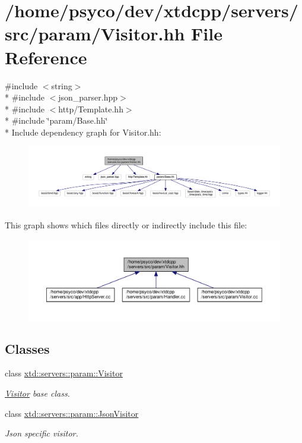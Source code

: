 \hypertarget{Visitor_8hh}{}\section{/home/psyco/dev/xtdcpp/servers/src/param/\+Visitor.hh File Reference}
\label{Visitor_8hh}
{\ttfamily \#include $<$string$>$}\\*
{\ttfamily \#include $<$json\+\_\+parser.\+hpp$>$}\\*
{\ttfamily \#include $<$http/\+Template.\+hh$>$}\\*
{\ttfamily \#include \char`\"{}param/\+Base.\+hh\char`\"{}}\\*
Include dependency graph for Visitor.\+hh\+:
\nopagebreak
\begin{figure}[H]
\begin{center}
\leavevmode
\includegraphics[width=350pt]{Visitor_8hh__incl}
\end{center}
\end{figure}
This graph shows which files directly or indirectly include this file\+:
\nopagebreak
\begin{figure}[H]
\begin{center}
\leavevmode
\includegraphics[width=350pt]{Visitor_8hh__dep__incl}
\end{center}
\end{figure}
\subsection*{Classes}
\begin{DoxyCompactItemize}
\item 
class \hyperlink{classxtd_1_1servers_1_1param_1_1Visitor}{xtd\+::servers\+::param\+::\+Visitor}
\begin{DoxyCompactList}\small\item\em \hyperlink{classxtd_1_1servers_1_1param_1_1Visitor}{Visitor} base class. \end{DoxyCompactList}\item 
class \hyperlink{classxtd_1_1servers_1_1param_1_1JsonVisitor}{xtd\+::servers\+::param\+::\+Json\+Visitor}
\begin{DoxyCompactList}\small\item\em Json specific visitor. \end{DoxyCompactList}\end{DoxyCompactItemize}
